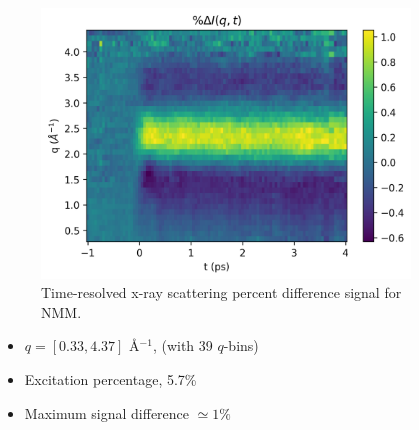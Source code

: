 \documentclass{beamer}
\begin{document}
\begin{frame}
	\begin{columns} 
		\begin{column}{.4\textwidth}
			\begin{figure}[H]
				\centering
				\includegraphics[width=\textwidth]{NMM_exp_2Dplot.png}
				\caption{Time-resolved x-ray scattering percent difference signal for NMM.}
				\label{fig:nmm-2dplot}
			\end{figure}
			\vspace{-5mm}
			\begin{itemize}
				\item $q = [0.33, 4.37] $ \AA$^{-1}$, (with 39 $q$-bins)
				\item Excitation percentage, 5.7\%
				\item Maximum signal difference $\simeq 1\%$
			\end{itemize}
		\end{column}
		\begin{column}{.6\textwidth}
			\begin{figure}[H]
				\centering

\end{figure}
\end{column}
\end{columns}
\end{frame}
\end{document}
